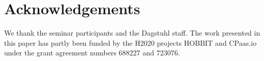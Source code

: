 \section*{Acknowledgements}
We thank the seminar participants and the Dagstuhl staff.
The work presented in this paper has partly been funded by the H2020 projects HOBBIT and CPaas.io under the grant agreement numbers 688227 and 723076.
